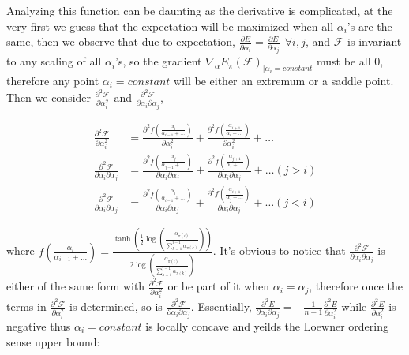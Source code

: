 \documentclass{article}
\begin{document}
Analyzing this function can be daunting as the derivative is complicated, at the very first we guess that the expectation will be maximized when all $\alpha_i$'s are the same, then we observe that due to expectation, $\frac{\partial E}{\partial \alpha_i} = \frac{\partial E}{\partial \alpha_j} \ \ \forall i,j$,
and $\mathcal{F}$ is invariant to any scaling of all $\alpha_i$'s, so the gradient $ \nabla_{\alpha} E_{\pi}(\mathcal{F})_{ |\alpha_i = constant}$ must be all 0, therefore
any point $\alpha_i = constant$ will be either an extremum or a saddle point. Then we consider $\frac{\partial^2 \mathcal{F}}{\partial \alpha_i^2}$ and $\frac{\partial^2 \mathcal{F}}{\partial \alpha_i \partial \alpha_j}$, 

\begin{equation}
  \begin{aligned}
    \frac{\partial^2 \mathcal{F}}{\partial \alpha_i^2} &= \frac{\partial^2 f(\frac{\alpha_i}{\alpha_{i-1}+ \ldots})}{\partial \alpha_i^2} + \frac{\partial^2 f(\frac{\alpha_{i+1}}{\alpha_{i}+ \ldots})}{\partial \alpha_i^2} + \ldots \nonumber  \\ 
    \frac{\partial^2 \mathcal{F}}{\partial \alpha_i \partial \alpha_j} &= \frac{\partial^2 f(\frac{\alpha_j}{\alpha_{j-1}+ \ldots})}{\partial \alpha_i\partial \alpha_j} + \frac{\partial^2 f(\frac{\alpha_{j+1}}{\alpha_{j}+ \ldots})}{\partial \alpha_i \partial \alpha_j} + \ldots (j > i)\\
    \frac{\partial^2 \mathcal{F}}{\partial \alpha_i \partial \alpha_j} &= \frac{\partial^2 f(\frac{\alpha_i}{\alpha_{i-1}+ \ldots})}{\partial \alpha_i\partial \alpha_j} + \frac{\partial^2 f(\frac{\alpha_{i+1}}{\alpha_{j}+ \ldots})}{\partial \alpha_i \partial \alpha_j} + \ldots (j < i) 
  \end{aligned}
\end{equation}

where $f(\frac{\alpha_i}{\alpha_{i-1}+ \ldots}) = \frac{\tanh(\frac{1}{2} \log(\frac{\alpha_{\pi(i)}}{\sum_{k=1}^{i-1} \alpha_{\pi(k)}}))}{2 \log (\frac{\alpha_{\pi(i)}}{\sum_{k=1}^{i-1} \alpha_{\pi(k)}})}$. It's obvious to notice that $\frac{\partial^2 \mathcal{F}}{\partial \alpha_i \partial \alpha_j}$ is either of the same form with $\frac{\partial^2 \mathcal{F}}{\partial \alpha_i^2}$ or be part of it
when $\alpha_i = \alpha_j$, therefore once the terms in $\frac{\partial^2 \mathcal{F}}{\partial \alpha_i^2}$
is determined, so is $\frac{\partial^2 \mathcal{F}}{\partial \alpha_i \partial \alpha_j}$. Essentially, $\frac{\partial^2 E}{\partial \alpha_i \partial \alpha_j} = -\frac{1}{n-1}\frac{\partial^2 E}{\partial \alpha_i^2} $ while
$\frac{\partial^2 E}{\partial \alpha_i^2}$ is negative thus $\alpha_i = constant$ is locally concave and 
yeilds the Loewner ordering sense upper bound:
\end{document}
